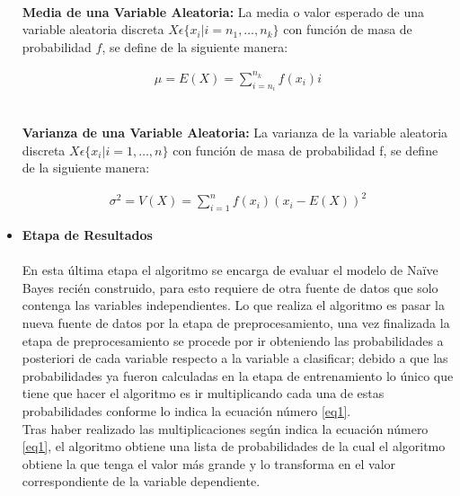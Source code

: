 \documentclass[letterpaper, 10 pt, conference]{ieeeconf}
\begin{document}
\begin{itemize}[leftmargin=*]
    \textbf{\\Media de una Variable Aleatoria:} La media o valor esperado de una variable aleatoria discreta $X \epsilon \{x_i | i = n_1,\dots, n_k\}$ con función de masa de probabilidad $f$, se define de la siguiente manera:

    \begin{equation}
    \begin{split}
    \mu = E(X) = \sum_{i=n_i}^{n_k} f(x_i)i
    \end{split}
    \end{equation}
    
    \textbf{\\Varianza de una Variable Aleatoria:} La varianza de la variable aleatoria discreta $X \epsilon \{x_i | i = 1,\dots,n\}$ con función de masa de probabilidad f, se define de la siguiente manera:

    \begin{equation}
    \begin{split}
    \sigma^2 = V(X) = \sum_{i=1}^{n} f(x_i)(x_i-E(X))^2
    \end{split}
    \end{equation}

    \item \textbf{Etapa de Resultados}
    \\ \\ En esta última etapa el algoritmo se encarga de evaluar el modelo de Naïve Bayes recién construido, para esto requiere de otra fuente de datos que solo contenga las variables independientes. Lo que realiza el algoritmo es pasar la nueva fuente de datos por la etapa de preprocesamiento, una vez finalizada la etapa de preprocesamiento se procede por ir obteniendo las probabilidades a posteriori de cada variable respecto a la variable a clasificar; debido a que las probabilidades ya fueron calculadas en la etapa de entrenamiento lo único que tiene que hacer el algoritmo es ir multiplicando cada una de estas probabilidades conforme lo indica la ecuación número \ref{eq1}.\\

    Tras haber realizado las multiplicaciones según indica la ecuación número \ref{eq1}, el algoritmo obtiene una lista de probabilidades de la cual el algoritmo obtiene la que tenga el valor más grande y lo transforma en el valor correspondiente de la variable dependiente.\\
\end{itemize}
\end{document}
